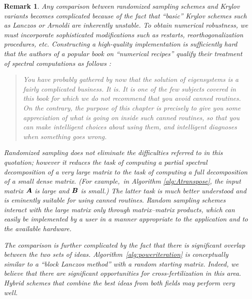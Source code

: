 \documentclass{article}
\newtheorem{remark}{Remark}
\begin{document}
\begin{remark} \rm
Any comparison between randomized sampling schemes and Krylov variants
becomes complicated because of the fact that ``basic'' Krylov schemes such
as Lanczos \cite[p.~473]{golub} or Arnoldi \cite[p.~499]{golub}
are inherently unstable. To obtain numerical robustness, we must incorporate
sophisticated modifications such as restarts, reorthogonalization procedures, etc.
Constructing a high-quality implementation is sufficiently hard that the authors
of a popular book on ``numerical recipes''
qualify their treatment of spectral computations as follows
\cite[p.~567]{2007_numerical_recipes}:

\lsp

\begin{quotation}
\noindent
You have probably gathered by now that the solution of eigensystems is a fairly complicated business.
It is. It is one of the few subjects covered in this book for which we do \emph{not} recommend that you avoid
canned routines. On the contrary, the purpose of this chapter is precisely to give you some appreciation of what
is going on inside such canned routines, so that you can make intelligent choices about using them, and intelligent
diagnoses when something goes wrong.
\end{quotation}

\lsp

\noindent
Randomized sampling does not eliminate the difficulties referred to in this quotation;
however it reduces the task of computing a \emph{partial} spectral decomposition
of a very large matrix to the task of computing a \emph{full} decomposition of
a small dense matrix.  (For example,~in Algorithm \ref{alg:Atranspose}, the input matrix
$\bm{A}$ is large and $\bm{B}$ is small.) The latter task is much better understood
and is eminently suitable for using canned routines.  Random sampling schemes
interact with the large matrix only through matrix--matrix products, which can
easily be implemented by a user in a manner appropriate to the application
and to the available hardware.


The comparison is further complicated by the fact that there is significant
overlap between the two sets of ideas. Algorithm~\ref{alg:poweriteration} is
conceptually similar to a ``block Lanczos method'' \cite[p.~485]{golub} with a random starting matrix.
Indeed, we believe that there are significant opportunities for cross-fertilization
in this area.  Hybrid schemes that combine the best ideas from both
fields may perform very well.
\end{remark}
\end{document}
